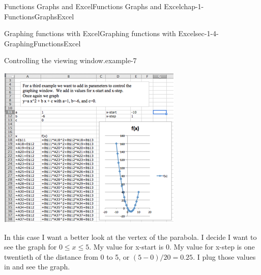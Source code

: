 \documentclass[oneside,10pt,]{book}
\numberwithin{equation}{section}
\begin{document}
\begin{chapterptx}{Functions Graphs and Excel}{}{Functions Graphs and Excel}{}{}{chap-1-FunctionsGraphsExcel}
\begin{sectionptx}{Graphing functions with Excel}{}{Graphing functions with Excel}{}{}{sec-1-4-GraphingFunctionsExcel}
\begin{example}{Controlling the viewing window.}{example-7}
\begin{sidebyside}{1}{0.1}{0.1}{0}
\begin{sbspanel}{0.8}
\includegraphics[width=1\linewidth]{images/sec1-4-8.png}
\end{sbspanel}%
\end{sidebyside}%
\par
\hypertarget{p-330}{}%
In this case I want a better look at the vertex of the parabola.  I decide I want to see the graph for \(0 \le x \le 5\).  My value for x-start is 0.  My value for x-step is one twentieth of the distance from 0 to 5, or \((5-0)/20 = 0.25\).  I plug those values in and see the graph.%
\begin{sidebyside}{1}{0.1}{0.1}{0}%
\begin{sbspanel}{0.8}%

\end{sbspanel}
\end{sidebyside}
\end{example}
\end{sectionptx}
\end{chapterptx}
\end{document}
